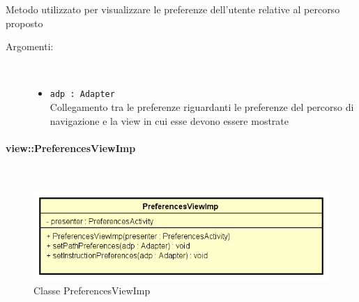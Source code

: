 \documentclass[../DefinizioneDiProdotto.tex]{subfiles}
\begin{document}
\begin{description}
\begin{itemize}
		Metodo utilizzato per visualizzare le preferenze dell'utente relative al percorso proposto
		\begin{description}
			\item[Argomenti:] \
			\begin{itemize}
				\item \texttt{adp : Adapter}\\
				Collegamento tra le preferenze riguardanti le preferenze del percorso di navigazione e la view in cui esse devono essere mostrate\end{itemize}
		\end{description}
	\end{itemize}
\end{description}

\paragraph{view::PreferencesViewImp}
\
\begin{figure}[H]
	\centering
	\includegraphics[width=\maxwidth]{img/PreferencesViewImp.png}
	\caption{Classe PreferencesViewImp}\label{fig:view::PreferencesViewImp} 
\end{figure}
\end{document}
